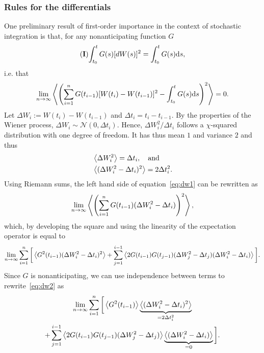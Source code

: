 \subsubsection{Rules for the differentials}
One preliminary result of first-order importance in the context of stochastic integration is that, for any nonanticipating function $G$
\begin{equation} \label{eq:dW=dt_int}
	\mathbf{(I)\!}\int_{t_0}^t G(s) \mathrm [dW(s)]^2 = \int_{t_0}^t G(s) \mathrm ds,	
\end{equation}
i.e. that
\begin{equation} \label{eq:dw1}
	\lim_{n\rightarrow\infty} \left\langle \left(\sum_{i=1}^n G(t_{i-1})[W(t_i)-W(t_{i-1})]^2-\int_{t_0}^t G(s) \mathrm ds\right)^2 \right\rangle = 0.
\end{equation}
Let $\Delta W_i := W(t_i) - W(t_{i-1})$ and $\Delta t_i = t_i - t_{i-1}$. By the properties of the Wiener process, $\Delta W_i \sim \mathcal{N}(0,\Delta t_i)$. Hence, $\Delta W_i^2/\Delta t_i$ follows a $\chi$-squared distribution with one degree of freedom. It has thus mean $1$ and variance $2$ and thus
\begin{subequations} \label{eq:dwprop}
\begin{align}
        &\left\langle \Delta W_i^2 \right\rangle = \Delta t_i, \quad \mbox{and} \label{eq:dwesp}\\
        &\left\langle (\Delta W_i^2 - \Delta t_i)^2 \right\rangle = 2 \Delta t_i^2. \label{eq:dwvar}
\end{align}
\end{subequations}
Using Riemann sums, the left hand side of equation~\eqref{eq:dw1} can be rewritten as
\begin{equation}
	\lim_{n\rightarrow\infty} \left\langle \left(\sum_{i=1}^n G(t_{i-1})(\Delta W_i^2-\Delta t_i)\right)^2 \right\rangle,
\end{equation}
which, by developing the square and using the linearity of the expectation operator is equal to
\begin{equation} \label{eq:dw2}
	\lim_{n\rightarrow\infty} \sum_{i=1}^n \bigg[\left\langle G^2(t_{i-1})(\Delta W_i^2-\Delta t_i)^2 \right\rangle + \sum_{j=1}^{i-1} \left\langle 2G(t_{i-1})G(t_{j-1})(\Delta W_j^2 - \Delta t_j)(\Delta W_i^2 - \Delta t_i) \right\rangle\bigg].
\end{equation}
Since $G$ is nonanticipating, we can use independence between terms to rewrite~\eqref{eq:dw2} as
\begin{multline} \label{eq:dw3}
	\lim_{n\rightarrow\infty} \sum_{i=1}^n \bigg[\left\langle G^2(t_{i-1}) \right\rangle\underbrace{\left\langle (\Delta W_i^2-\Delta t_i)^2 \right\rangle}_{=2\Delta t_i^2} \\ + \sum_{j=1}^{i-1} \left\langle 2G(t_{i-1})G(t_{j-1})(\Delta W_j^2 - \Delta t_j) \right\rangle\underbrace{\left\langle (\Delta W_i^2 - \Delta t_i) \right\rangle}_{=0}\bigg].
\end{multline}
